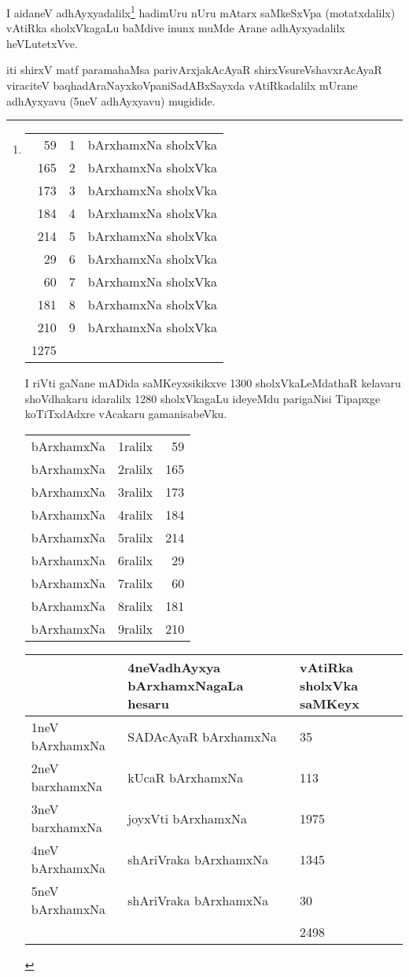 \begin{artha}
I aidaneV adhAyxyadalilx\footnote[1]{
\begin{tabular}{rll}
59 &1 & bArxhamxNa sholxVka\\
165 & 2 & bArxhamxNa sholxVka\\
173 & 3 & bArxhamxNa sholxVka\\
184 & 4 & bArxhamxNa sholxVka\\
214 & 5 & bArxhamxNa sholxVka\\
29 & 6 & bArxhamxNa sholxVka\\
60 & 7 & bArxhamxNa sholxVka\\
181 & 8 & bArxhamxNa sholxVka\\
210 & 9 & bArxhamxNa sholxVka\\
\hline
1275
\end{tabular}

I riVti gaNane mADida saMKeyxsikikxve
1300 sholxVkaLeMdathaR kelavaru shoVdhakaru idaralilx 1280 sholxVkagaLu ideyeMdu parigaNisi Tipapxge koTiTxdAdxre vAcakaru gamanisabeVku.

\begin{tabular}{lrr}
bArxhamxNa & 1ralilx & 59\\
bArxhamxNa & 2ralilx & 165\\
bArxhamxNa & 3ralilx & 173\\
bArxhamxNa & 4ralilx & 184\\
bArxhamxNa & 5ralilx & 214\\
bArxhamxNa & 6ralilx & 29\\
bArxhamxNa & 7ralilx & 60\\
bArxhamxNa & 8ralilx & 181\\
bArxhamxNa & 9ralilx & 210
\end{tabular}


\begin{tabular}{|l|l|l|}
\hline
& 4neVadhAyxya bArxhamxNagaLa hesaru & vAtiRka sholxVka saMKeyx\\
\hline
1neV bArxhamxNa & SADAcAyaR bArxhamxNa & 35\\
2neV barxhamxNa & kUcaR bArxhamxNa & 113\\
3neV barxhamxNa & joyxVti bArxhamxNa & 1975\\
4neV bArxhamxNa & shAriVraka bArxhamxNa & 1345\\
5neV bArxhamxNa & shAriVraka bArxhamxNa & 30\\
\hline
& &  2498\\
\hline
\end{tabular}
} hadimUru nUru mAtarx saMkeSxVpa (motatxdalilx) vAtiRka sholxVkagaLu baMdive inunx muMde Arane adhAyxyadalilx heVLutetxVve.
\end{artha}

\begin{center}
iti shirxV matf paramahaMsa parivArxjakAcAyaR shirxVsureVshavxrAcAyaR viraciteV baqhadAraNayxkoVpaniSadABxSayxda vAtiRkadalilx mUrane adhAyxyavu (5neV adhAyxyavu) mugidide.
\end{center}

